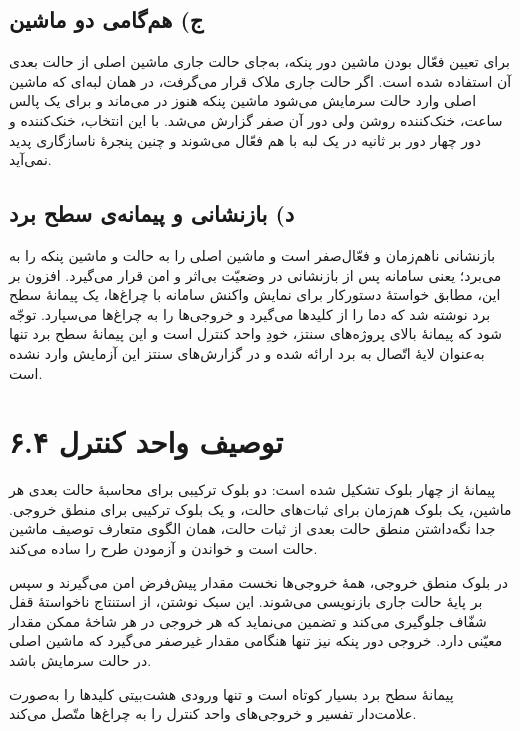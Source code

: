 \documentclass[12pt,a4paper]{article}
\begin{document}
	\subsection*{ج) هم‌گامی دو ماشین}
	برای تعیین فعّال بودن ماشین دور پنکه، به‌جای حالت جاری ماشین اصلی از حالت بعدی آن استفاده شده است. اگر حالت جاری ملاک قرار می‌گرفت، در همان لبه‌ای که ماشین اصلی وارد حالت سرمایش می‌شود ماشین پنکه هنوز در  می‌ماند و برای یک پالس ساعت، خنک‌کننده روشن ولی دور آن صفر گزارش می‌شد. با این انتخاب، خنک‌کننده و دور چهار دور بر ثانیه در یک لبه با هم فعّال می‌شوند و چنین پنجرهٔ ناسازگاری پدید نمی‌آید.

	\subsection*{د) بازنشانی و پیمانه‌ی سطح برد}
	بازنشانی ناهم‌زمان و فعّال‌صفر است و ماشین اصلی را به حالت  و ماشین پنکه را به  می‌برد؛ یعنی سامانه پس از بازنشانی در وضعیّت بی‌اثر و امن قرار می‌گیرد. افزون بر این، مطابق خواستهٔ دستورکار برای نمایش واکنش سامانه با چراغ‌ها، یک پیمانهٔ سطح برد نوشته شد که دما را از کلیدها می‌گیرد و خروجی‌ها را به چراغ‌ها می‌سپارد. توجّه شود که پیمانهٔ بالای پروژه‌های سنتز، خودِ واحد کنترل است و این پیمانهٔ سطح برد تنها به‌عنوان لایهٔ اتّصال به برد ارائه شده و در گزارش‌های سنتز این آزمایش وارد نشده است.

	\section*{۶.۴ توصیف واحد کنترل}
	پیمانهٔ  از چهار بلوک تشکیل شده است: دو بلوک ترکیبی برای محاسبهٔ حالت بعدی هر ماشین، یک بلوک هم‌زمان برای ثبات‌های حالت، و یک بلوک ترکیبی برای منطق خروجی. جدا نگه‌داشتن منطق حالت بعدی از ثبات حالت، همان الگوی متعارف توصیف ماشین حالت است و خواندن و آزمودن طرح را ساده می‌کند.

	در بلوک منطق خروجی، همهٔ خروجی‌ها نخست مقدار پیش‌فرض امن می‌گیرند و سپس بر پایهٔ حالت جاری بازنویسی می‌شوند. این سبک نوشتن، از استنتاج ناخواستهٔ قفل شفّاف جلوگیری می‌کند و تضمین می‌نماید که هر خروجی در هر شاخهٔ ممکن مقدار معیّنی دارد. خروجی دور پنکه نیز تنها هنگامی مقدار غیرصفر می‌گیرد که ماشین اصلی در حالت سرمایش باشد.


	پیمانهٔ سطح برد بسیار کوتاه است و تنها ورودی هشت‌بیتی کلیدها را به‌صورت علامت‌دار تفسیر و خروجی‌های واحد کنترل را به چراغ‌ها متّصل می‌کند.
\end{document}
